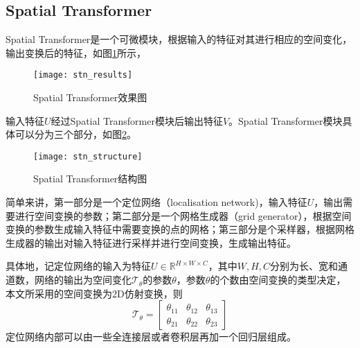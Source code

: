 \subsection{Spatial Transformer}
Spatial Transformer是一个可微模块，根据输入的特征对其进行相应的空间变化，输出变换后的特征，如图\ref{fig:spatial_transformer_results}所示，
\begin{figure}[ht]
  \centering
  \texttt{[image: stn\_results]}
  \caption{Spatial Transformer效果图}
  \label{fig:spatial_transformer_results}
\end{figure}
输入特征$U$经过Spatial Transformer模块后输出特征$V$。Spatial Transformer模块具体可以分为三个部分，如图\ref{fig:spatial_transformer}。
\begin{figure}[ht]
  \centering
  \texttt{[image: stn\_structure]}
  \caption{Spatial Transformer结构图}
  \label{fig:spatial_transformer}
\end{figure}
简单来讲，第一部分是一个定位网络（localisation network)，输入特征$U$，输出需要进行空间变换的参数；第二部分是一个网格生成器（grid generator），根据空间变换的参数生成输入特征中需要变换的点的网格；第三部分是个采样器，根据网格生成器的输出对输入特征进行采样并进行空间变换，生成输出特征。

具体地，记定位网络的输入为特征$U\in \mathbb{R}^{H\times W\times C}$，其中$W,H,C$分别为长、宽和通道数，网络的输出为空间变化$\mathcal{T}_{\theta}$的参数$\theta$，参数$\theta$的个数由空间变换的类型决定，本文所采用的空间变换为2D仿射变换，则
\begin{equation}
  \mathcal{T}_\theta = \left[
    \begin{array}{ccc}
      \theta_{11}&\theta_{12}&\theta_{13}\\
      \theta_{21}&\theta_{22}&\theta_{23}
    \end{array}
    \right]
\end{equation}
定位网络内部可以由一些全连接层或者卷积层再加一个回归层组成。

